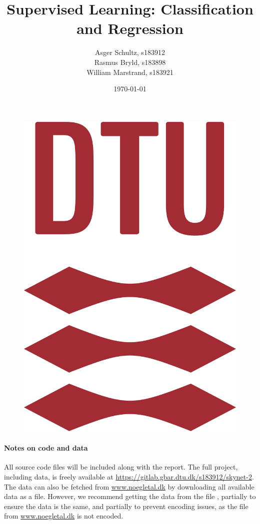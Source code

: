 \documentclass[11pt,fleqn]{article}
\title{Supervised Learning: Classification and Regression}
\author{Asger Schultz, s183912\\
	Rasmus Bryld, s183898\\
	William Marstrand, s183921}
\date{\today}
\numberwithin{footnote}{section}
\numberwithin{figure}{section}
\numberwithin{table}{section}
\begin{document}
\maketitle
\begin{figure}[H]
	\centering
	\includegraphics[width=(\textwidth/2)]{DTU_logo}
\end{figure}
\thispagestyle{empty}
\clearpage

\tableofcontents
\thispagestyle{empty}

\paragraph{Notes on code and data} All source code files will be included along with the report. The full project, including data, is freely available at \url{https://gitlab.gbar.dtu.dk/s183912/skynet-2}. The data can also be fetched from \url{www.noegletal.dk} by downloading all available data as a  file. However, we recommend getting the data from the file , partially to ensure the data is the same, and partially to prevent encoding issues, as the  file from \url{www.noegletal.dk} is not  encoded.
\end{document}

